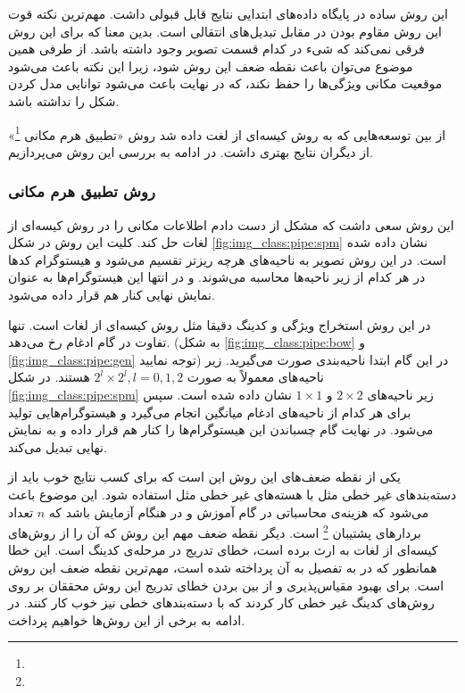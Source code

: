 \documentclass[11pt]{article}
\begin{document}
این روش ساده در پایگاه داده‌های ابتدایی نتایج قابل قبولی داشت. مهم‌ترین نکته قوت این روش مقاوم بودن در مقابل تبدیل‌های انتقالی است. بدین معنا که برای این روش فرقی نمی‌کند که شی‌ء در کدام قسمت تصویر وجود داشته باشد. از طرفی همین موضوع می‌توان باعث نقطه ضعف این روش شود، زیرا این نکته باعث می‌شود موقعیت مکانی ویژگی‌ها را حفظ نکند، که در نهایت باعث می‌شود توانایی مدل کردن شکل را نداشته باشد.

از بین توسعه‌هایی که به روش کیسه‌ای از لغت داده شد
\cite{jurie2005, nn_img_class, berg2005}
روش «تطبیق هرم مکانی
\footnote{}» \cite{spm}
از دیگران نتایج بهتری داشت. در ادامه به بررسی این روش می‌پردازیم.
\subsubsection{روش تطبیق هرم مکانی}
این روش
\cite{spm}
سعی داشت که مشکل از دست دادم اطلاعات مکانی را در روش کیسه‌ای از لغات حل کند. کلیت این روش در شکل
\ref{fig:img_class:pipe:spm}
نشان داده شده است. در این روش تصویر به ناحیه‌های هرچه ریزتر تقسیم می‌شود و هیستوگرام کدها در هر کدام از زیر ناحیه‌ها محاسبه می‌شوند. و در انتها این هیستوگرام‌ها به عنوان نمایش نهایی کنار هم قرار داده می‌شود.

در این روش استخراج ویژگی و کدینگ دقیقا مثل روش کیسه‌ای از لغات است. تنها تفاوت در گام ادغام رخ می‌دهد. (به شکل
\ref{fig:img_class:pipe:bow} و
\ref{fig:img_class:pipe:gen}
توجه نمایید)
در این گام ابتدا ناحیه‌بندی صورت می‌گیرید. زیر ناحیه‌های معمولاً به صورت
$2 ^ l \times 2 ^ l , l = 0, 1, 2$
هستند. در شکل
\ref{fig:img_class:pipe:spm}
زیر ناحیه‌های
$2 \times 2$ و $1 \times 1$
نشان داده شده است. سپس برای هر کدام از ناحیه‌های ادغام میانگین انجام می‌گیرد و هیستوگرام‌هایی تولید می‌شود. در نهایت گام چسباندن این هیستوگرام‌ها را کنار هم قرار داده و به نمایش نهایی تبدیل می‌کند.

یکی از نقطه ضعف‌های این روش این است که برای کسب نتایج خوب باید از دسته‌بندهای غیر خطی مثل
با هسته‌های غیر خطی مثل
 استفاده شود.
این موضوع باعث می‌شود که هزینه‌ی محاسباتی در گام آموزش
و در هنگام آزمایش
باشد که $n$ تعداد بردارهای پشتیبان
\footnote{}
است. دیگر نقطه ضعف مهم این روش که آن را از روش‌های کیسه‌ای از لغات به ارث برده است، خطای تدریج در مرحله‌ی کدینگ است. این خطا همانطور که در
\cite{nn_img_class}
به تفصیل به آن پرداخته شده است، مهم‌ترین نقطه ضعف این روش است.
برای بهبود مقیاس‌پذیری و از بین بردن خطای تدریج این روش محققان بر روی روش‌های کدینگ غیر خطی کار کردند که با دسته‌بندهای خطی نیز خوب کار کنند. در ادامه به برخی از این روش‌ها خواهیم پرداخت.
\end{document}
